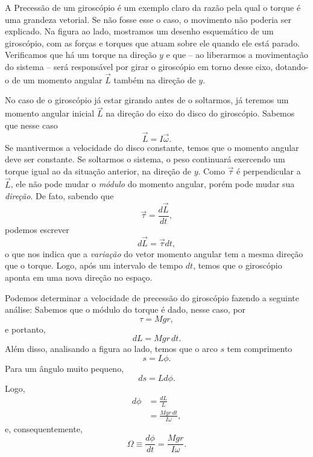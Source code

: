 A Precessão de um giroscópio é um exemplo claro da razão pela qual o torque é uma grandeza vetorial. Se não fosse esse o caso, o movimento não poderia ser explicado. Na figura ao lado, mostramos um desenho esquemático de um giroscópio, com as forças e torques que atuam sobre ele quando ele está parado. Verificamos que há um torque na direção $y$ e que -- ao liberarmos a movimentação do sistema -- será responsável por girar o giroscópio em torno desse eixo, dotando-o de um momento angular $\vec{L}$ também na direção de $y$.

No caso de o giroscópio já estar girando antes de o soltarmos, já teremos um momento angular inicial $\vec{L}$ na direção do eixo do disco do giroscópio. Sabemos que nesse caso 
\begin{equation}
  \vec{L} = I\vec{\omega}.
\end{equation}
%
Se mantivermos a velocidade do disco constante, temos que o momento angular deve ser constante. Se soltarmos o sistema, o peso continuará exercendo um torque igual ao da situação anterior, na direção de $y$. Como $\vec{\tau}$ é perpendicular a $\vec{L}$, ele não pode mudar o \emph{módulo} do momento angular, porém pode mudar sua \emph{direção}. De fato, sabendo que
\begin{equation}
  \vec{\tau} = \frac{d\vec{L}}{dt},
\end{equation}
%
podemos escrever
\begin{equation}
  d\vec{L} = \vec{\tau} dt,
\end{equation}
%
o que nos indica que a \emph{variação} do vetor momento angular tem a mesma direção que o torque. Logo, após um intervalo de tempo $dt$, temos que o giroscópio aponta em uma nova direção no espaço.

Podemos determinar a velocidade de precessão do giroscópio fazendo a seguinte análise: Sabemos que o módulo do torque é dado, nesse caso, por
\begin{equation}
  \tau = Mgr,
\end{equation}
%
e portanto,
\begin{equation}
  dL = Mgr\,dt.
\end{equation}
%
Além disso, analisando a figura ao lado, temos que o arco $s$ tem comprimento
\begin{equation}
  s = L \phi.
\end{equation}
%
Para um ângulo muito pequeno,
\begin{equation}
  ds = L d\phi.
\end{equation}
%
Logo,
\begin{align}
  d\phi &= \frac{dL}{L} \\
  &= \frac{Mgr\,dt}{I\omega},
\end{align}
%
e, consequentemente,
\begin{equation}
  \Omega \equiv \frac{d\phi}{dt} = \frac{Mgr}{I\omega}.
\end{equation}
